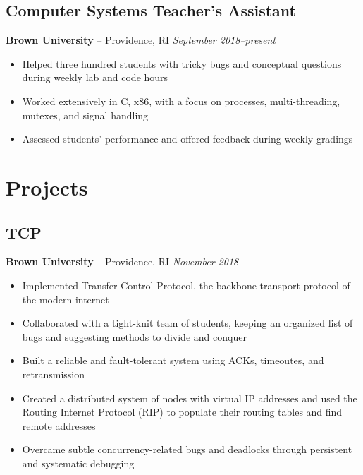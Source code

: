 \documentclass[11pt]{article}
\begin{document}
\subsection{Computer Systems Teacher's Assistant}
\textbf{Brown University} -- Providence, RI \hfill \textit{September 2018--present}

\begin{itemize}
	\item Helped three hundred students with tricky bugs and conceptual questions during weekly lab and code hours
	\item Worked extensively in C, x86, with a focus on processes, multi-threading, mutexes, and signal handling
	\item Assessed students' performance and offered feedback during weekly gradings
\end{itemize}


\section{Projects}
\subsection{TCP}
\textbf{Brown University} -- Providence, RI \hfill \textit{November 2018}
\begin{itemize}
	\item Implemented Transfer Control Protocol, the backbone transport protocol of the modern internet 
	\item Collaborated with a tight-knit team of students, keeping an organized list of bugs and suggesting methods to divide and conquer
	\item Built a reliable and fault-tolerant system using ACKs, timeoutes, and retransmission
	\item Created a distributed system of nodes with virtual IP addresses and used the Routing Internet Protocol (RIP) to populate their routing tables and find remote addresses
	\item Overcame subtle concurrency-related bugs and deadlocks through persistent and systematic debugging 
\end{itemize}
\end{document}
